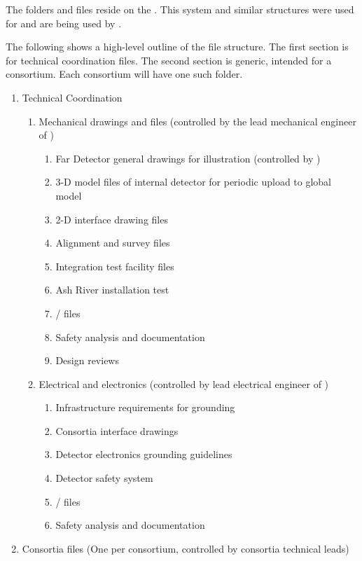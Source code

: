 The folders and files reside on the . This system and
similar structures were used for  and are being
used by .


The following shows a high-level outline of the file structure. The
first section is for technical coordination files. The second
section is generic, intended for a consortium. Each consortium will have one such
folder.
\begin{enumerate}
 \item Technical Coordination
 \begin{enumerate}
  \item Mechanical drawings and files (controlled by the lead mechanical engineer of )
  \begin{enumerate}
    \item Far Detector general drawings for illustration (controlled by )
    \item 3-D model files of internal detector for periodic upload to global model
    \item 2-D interface drawing files    
    \item Alignment and survey files
    \item Integration test facility files
    \item Ash River installation test  
    \item {}/ files
    \item Safety analysis and documentation
    \item Design reviews
  \end{enumerate}
  \item Electrical and electronics (controlled by lead electrical engineer of )
  \begin{enumerate}
    \item Infrastructure requirements for grounding
    \item Consortia interface drawings
    \item Detector electronics grounding guidelines
    \item Detector safety system
    \item {}/ files
    \item Safety analysis and documentation
  \end{enumerate}
 \end{enumerate}
 \item Consortia files (One per consortium, controlled by consortia technical leads)

\end{enumerate}
